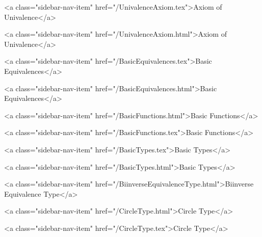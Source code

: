       
    
      
        
          <a class="sidebar-nav-item" href="/UnivalenceAxiom.tex">Axiom of Univalence</a>
        
      
    
      
        
          <a class="sidebar-nav-item" href="/UnivalenceAxiom.html">Axiom of Univalence</a>
        
      
    
      
        
          <a class="sidebar-nav-item" href="/BasicEquivalences.tex">Basic Equivalences</a>
        
      
    
      
        
          <a class="sidebar-nav-item" href="/BasicEquivalences.html">Basic Equivalences</a>
        
      
    
      
        
          <a class="sidebar-nav-item" href="/BasicFunctions.html">Basic Functions</a>
        
      
    
      
        
          <a class="sidebar-nav-item" href="/BasicFunctions.tex">Basic Functions</a>
        
      
    
      
        
          <a class="sidebar-nav-item" href="/BasicTypes.tex">Basic Types</a>
        
      
    
      
        
          <a class="sidebar-nav-item" href="/BasicTypes.html">Basic Types</a>
        
      
    
      
        
          <a class="sidebar-nav-item" href="/BiinverseEquivalenceType.html">Biinverse Equivalence Type</a>
        
      
    
      
        
          <a class="sidebar-nav-item" href="/CircleType.html">Circle Type</a>
        
      
    
      
        
          <a class="sidebar-nav-item" href="/CircleType.tex">Circle Type</a>
        
